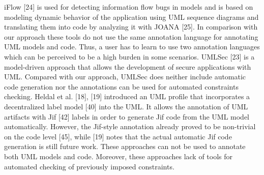 iFlow [24] is used for detecting information flow bugs in
models and is based on modeling dynamic behavior of the
application using UML sequence diagrams and translating
them into code by analyzing it with JOANA [25]. In comparison with our approach these tools do not use the same
annotation language for annotating UML models and code.
Thus, a user has to learn to use two annotation languages
which can be perceived to be a high burden in some scenarios.
UMLSec [23] is a model-driven approach that allows the
development of secure applications with UML. Compared with
our approach, UMLSec does neither include automatic code
generation nor the annotations can be used for automated
constraints checking. Heldal et al. [18], [19] introduced an
UML profile that incorporates a decentralized label model [40]
into the UML. It allows the annotation of UML artifacts with
Jif [42] labels in order to generate Jif code from the UML
model automatically. However, the Jif-style annotation already
proved to be non-trivial on the code level [45], while [19]
notes that the actual automatic Jif code generation is still future
work. These approaches can not be used to annotate both UML
models and code. Moreover, these approaches lack of tools for
automated checking of previously imposed constraints.